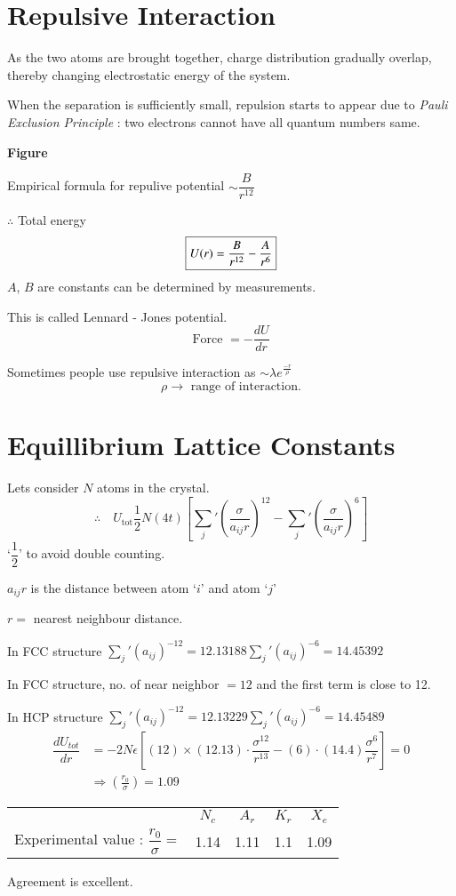 \section*{Repulsive Interaction}

As the two atoms are brought together, charge distribution gradually overlap, thereby changing electrostatic energy of the system.

When the separation is sufficiently small, repulsion starts to appear due to {\em Pauli Exclusion Principle} : two electrons cannot have all quantum numbers same.
\begin{center}
{\bf Figure}
\end{center}

Empirical formula for repulive potential $\sim \dfrac{B}{r^{12}}$

$\therefore$ Total energy
$$
\fbox{$U(r)=\dfrac{B}{r^{12}}-\dfrac{A}{r^{6}}$}
$$
$A$, $B$ are constants can be determined by measurements.

This is called Lennard - Jones potential.
$$
\text{Force } = -\dfrac{dU}{dr}
$$

Sometimes people use repulsive interaction as $\sim \lambda e^{\frac{-r}{\rho}}$
$$
\rho \to \text{ range of interaction.}
$$

\section*{Equillibrium Lattice Constants}

Lets consider $N$ atoms in the crystal.
$$
\therefore\quad U_{\text{tot}}\frac{1}{2}N(4t)\left[{\sum\limits_{j}}'\left(\dfrac{\sigma}{a_{ij}r}\right)^{12}-{\sum\limits_{j}}'\left(\dfrac{\sigma}{a_{ij}r}\right)^{6}\right]
$$
`$\dfrac{1}{2}$' to avoid double counting.

$a_{ij}r$ is the distance between atom `$i$' and atom `$j$'

$r=$ nearest neighbour distance.

In FCC structure ${\sum\limits_{j}}'(a_{ij})^{-12}=12.13188$\quad ${\sum\limits_{j}}'(a_{ij})^{-6}=14.45392$

In FCC structure, no. of near neighbor $=12$ and the first term is close to 12.

In HCP structure ${\sum\limits_{j}}'(a_{ij})^{-12}=12.13229$\quad ${\sum\limits_{j}}'(a_{ij})^{-6}=14.45489$
\begin{align*}
\dfrac{dU_{tot}}{dr} &= -2N\epsilon \left[(12)\times (12.13)\cdot \dfrac{\sigma^{12}}{r^{13}}-(6)\cdot (14.4)\dfrac{\sigma^{6}}{r^{7}}\right]=0\\
&\Rightarrow \left(\frac{r_{0}}{\sigma}\right)=1.09
\end{align*}
\begin{center}
\begin{tabular}{lcccc}
 & $N_{c}$ & $A_{r}$ & $K_{r}$ & $X_{e}$\\
Experimental value : $\dfrac{r_{0}}{\sigma}=$ & 1.14 & 1.11 & 1.1 & 1.09\\
\end{tabular}
\end{center}
Agreement is excellent.

